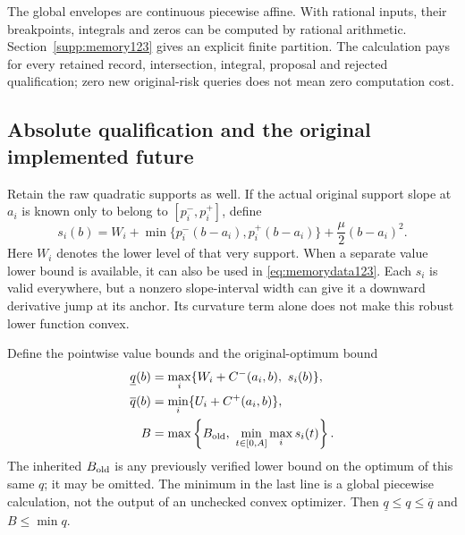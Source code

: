 The global envelopes are continuous piecewise affine. With rational
inputs, their breakpoints, integrals and zeros can be computed by rational
arithmetic. Section~\ref{supp:memory123} gives an explicit finite partition.
The calculation pays for every retained record, intersection, integral,
proposal and rejected qualification; zero new original-risk queries does
not mean zero computation cost.

\subsection{Absolute qualification and the original implemented future}

Retain the raw quadratic supports as well. If the actual original support
slope at $a_i$ is known only to belong to $[p_i^-,p_i^+]$, define
\begin{equation}\label{eq:rawsupport123}
 s_i(b)=W_i+\min\{p_i^-(b-a_i),p_i^+(b-a_i)\}
                   +\frac\mu2(b-a_i)^2.
\end{equation}
Here $W_i$ denotes the lower level of that very support. When a separate
value lower bound is available, it can also be used in
\eqref{eq:memorydata123}. Each $s_i$ is valid everywhere, but a nonzero
slope-interval width can give it a downward derivative jump at its
anchor. Its curvature term alone does not make this robust lower
function convex.

Define the pointwise value bounds and the original-optimum bound
\begin{align}
 \underline q(b)
  &=\max_i\{W_i+C^-(a_i,b),\ s_i(b)\},\nonumber\\
 \overline q(b)
  &=\min_i\{U_i+C^+(a_i,b)\},\label{eq:memoryabsolute123}\\
 B&=\max\left\{B_{\rm old},\
               \min_{t\in[0,A]}\max_i s_i(t)\right\}.
               \nonumber
\end{align}
The inherited $B_{\rm old}$ is any previously verified lower bound on
the optimum of this same $q$; it may be omitted. The minimum in the last
line is a global piecewise calculation, not the output of an unchecked
convex optimizer. Then $\underline q\le q\le\overline q$ and
$B\le\min q$.

